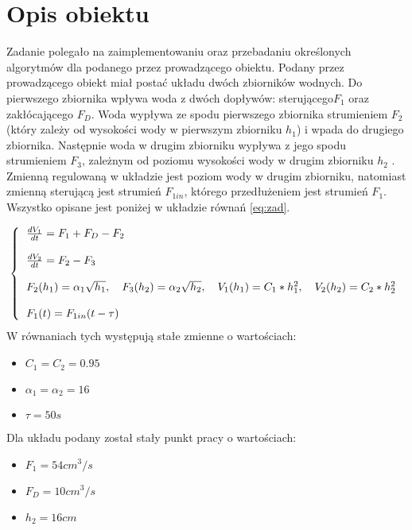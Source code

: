 \chapter{Opis obiektu}
	\label{ch:opis}
	Zadanie polegało na zaimplementowaniu oraz przebadaniu określonych algorytmów dla podanego przez prowadzącego obiektu. Podany przez prowadzącego obiekt miał postać układu dwóch zbiorników wodnych. Do pierwszego zbiornika wpływa woda z dwóch dopływów: sterującego$F_1$ oraz zakłócającego $F_D$. Woda wypływa ze spodu pierwszego zbiornika strumieniem $F_2$ (który zależy od wysokości wody w pierwszym zbiorniku $h_1$) i wpada do drugiego zbiornika. Następnie woda w drugim zbiorniku wypływa z jego spodu strumieniem $F_3$, zależnym od poziomu wysokości wody w drugim zbiorniku $h_2$ . Zmienną regulowaną w układzie jest poziom wody w drugim zbiorniku, natomiast zmienną sterującą jest strumień $F_{1in}$, którego przedłużeniem jest strumień $F_1$. Wszystko opisane jest poniżej w układzie równań \ref{eq:zad}.
	
	\begin{equation}
		\left\{
			\begin{tabular}{l}
				$\frac{dV_1}{dt} = F_1 + F_D - F_2$ \\\\
				$\frac{dV_2}{dt} = F_2 - F_3$\\\\
				$F_2(h_1) = \alpha_1\sqrt{h_1},\quad F_3(h_2) = \alpha_2\sqrt{h_2},\quad V_1(h_1)=C_1*h_1^2,\quad V_2(h_2)=C_2*h_2^2$\\\\
				$F_1(t) = F_{1in}(t-\tau)$
			\end{tabular}
		\right.
		\label{eq:zad}
	\end{equation}
	W równaniach tych występują stałe zmienne o wartościach:
	\begin{itemize}
		\item $C_1 = C_2 = 0.95$
		\item $\alpha_1 = \alpha_2 = 16$
		\item $\tau = 50s$
	\end{itemize}
	Dla układu podany został stały punkt pracy o wartościach:
	\begin{itemize}
		\item $F_1=54cm^3/s$
		\item $F_D=10cm^3/s$
		\item $h_2 = 16cm$
	\end{itemize}
	\newpage